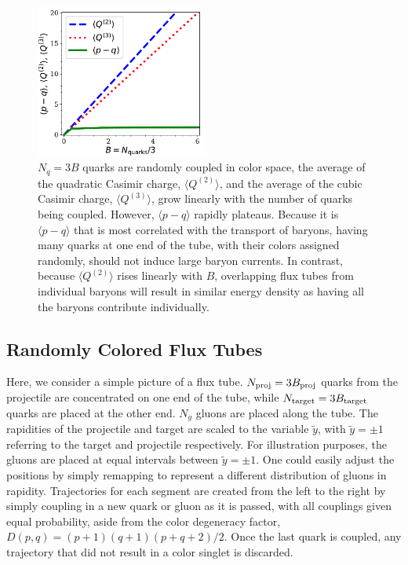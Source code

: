 \documentclass[aps, prc, 12pt, nofootinbib, showpacs, superscriptaddress, tightenlines, groupedaddress]{revtex4-2}
\begin{document}
\begin{figure}
\centerline{\includegraphics[width=0.5\textwidth]{figs/pminusq}}
\caption{\label{fig:pminusq}
$N_q=3B$ quarks are randomly coupled in color space, the average of the quadratic Casimir charge, $\langle Q^{(2)}\rangle$, and the average of the cubic Casimir charge, $\langle Q^{(3)}\rangle$, grow linearly with the number of quarks being coupled. However, $\langle p-q\rangle$ rapidly plateaus. Because it is $\langle p-q\rangle$ that is most correlated with the transport of baryons, having many quarks at one end of the tube, with their colors assigned randomly, should not induce large baryon currents. In contrast, because $\langle Q^{(2)}\rangle$ rises linearly with $B$, overlapping flux tubes from individual baryons will result in similar energy density as having all the baryons contribute individually.
}
\end{figure}

\subsection{Randomly Colored Flux Tubes}

Here, we consider a simple picture of a flux tube. $N_{\rm proj}=3B_{\rm proj}$ quarks from the projectile are concentrated on one end of the tube, while $N_{\rm target}=3B_{\rm target}$ quarks are placed at the other end. $N_g$ gluons are placed along the tube. The rapidities of the projectile and target are scaled to the variable $\tilde{y}$, with $\tilde{y}=\pm 1$ referring to the target and projectile respectively. For illustration purposes, the gluons are placed at equal intervals between $\tilde{y}=\pm 1$. One could easily adjust the positions by simply remapping to represent a different distribution of gluons in rapidity. Trajectories for each segment are created from the left to the right by simply coupling in a new quark or gluon as it is passed, with all couplings given equal probability, aside from the color degeneracy factor, $D(p,q)=(p+1)(q+1)(p+q+2)/2$. Once the last quark is coupled, any trajectory that did not result in a color singlet is discarded. 
\end{document}
